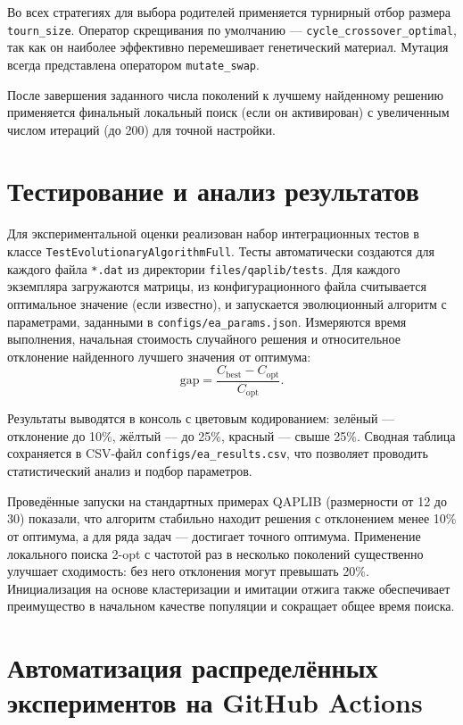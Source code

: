\documentclass[732]{studrep}
\theoremstyle{nonumberplain}
\begin{document}
Во всех стратегиях для выбора родителей применяется турнирный отбор размера \texttt{tourn\_size}. Оператор скрещивания по умолчанию — \texttt{cycle\_crossover\_optimal}, так как он наиболее эффективно перемешивает генетический материал. Мутация всегда представлена оператором \texttt{mutate\_swap}.

После завершения заданного числа поколений к лучшему найденному решению применяется финальный локальный поиск (если он активирован) с увеличенным числом итераций (до 200) для точной настройки.

\section{Тестирование и анализ результатов}
\label{sec:testing}

Для экспериментальной оценки реализован набор интеграционных тестов в классе \texttt{TestEvolutionaryAlgorithmFull}. Тесты автоматически создаются для каждого файла \texttt{*.dat} из директории \texttt{files/qaplib/tests}. Для каждого экземпляра загружаются матрицы, из конфигурационного файла считывается оптимальное значение (если известно), и запускается эволюционный алгоритм с параметрами, заданными в \texttt{configs/ea\_params.json}. Измеряются время выполнения, начальная стоимость случайного решения и относительное отклонение найденного лучшего значения от оптимума:
\[
\text{gap} = \frac{C_{\text{best}} - C_{\text{opt}}}{C_{\text{opt}}}.
\]

Результаты выводятся в консоль с цветовым кодированием: зелёный — отклонение до 10\%, жёлтый — до 25\%, красный — свыше 25\%. Сводная таблица сохраняется в CSV-файл \texttt{configs/ea\_results.csv}, что позволяет проводить статистический анализ и подбор параметров.

Проведённые запуски на стандартных примерах QAPLIB (размерности от 12 до 30) показали, что алгоритм стабильно находит решения с отклонением менее 10\% от оптимума, а для ряда задач — достигает точного оптимума. Применение локального поиска 2-opt с частотой раз в несколько поколений существенно улучшает сходимость: без него отклонения могут превышать 20\%. Инициализация на основе кластеризации и имитации отжига также обеспечивает преимущество в начальном качестве популяции и сокращает общее время поиска.

\section{Автоматизация распределённых экспериментов на GitHub Actions}
\label{sec:ci_workflow}
\end{document}
